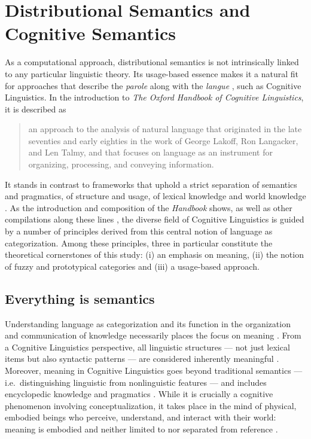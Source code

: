 \documentclass[
]{book}
\begin{document}
\hypertarget{cog}{%
\section{Distributional Semantics and Cognitive Semantics}\label{cog}}

As a computational approach, distributional semantics is not intrinsically linked to any particular linguistic theory. Its usage-based essence makes it a natural fit for approaches that describe the \emph{parole} along with the \emph{langue} \autocite[in terms of][]{desaussure_1971}, such as Cognitive Linguistics. In the introduction to \emph{The Oxford Handbook of Cognitive Linguistics}, it is described as

\begin{quote}
an approach to the analysis of natural language that originated in the late seventies and early eighties in the work of George Lakoff, Ron Langacker, and Len Talmy, and that focuses on language as an instrument for organizing, processing, and conveying information. \autocite[3]{geeraerts.cuyckens_2007a}
\end{quote}

It stands in contrast to frameworks that uphold a strict separation of semantics and pragmatics, of structure and usage, of lexical knowledge and world knowledge \autocite{geeraerts_2010a}. As the introduction and composition of the \emph{Handbook} shows, as well as other compilations along these lines \autocites[such as][]{rudzka-ostyn_1988,kristiansen.etal_2006,ibarretxe-antunano.valenzuela_2016}, the diverse field of Cognitive Linguistics is guided by a number of principles derived from this central notion of language as categorization. Among these principles, three in particular constitute the theoretical cornerstones of this study: (i) an emphasis on meaning, (ii) the notion of fuzzy and prototypical categories and (iii) a usage-based approach.

\hypertarget{everything-is-semantics}{%
\subsection{Everything is semantics}\label{everything-is-semantics}}

Understanding language as categorization and its function in the organization and communication of knowledge necessarily places the focus on meaning \autocite{geeraerts.cuyckens_2007,geeraerts_2016a}. From a Cognitive Linguistics perspective, all linguistic structures --- not just lexical items but also syntactic patterns --- are considered inherently meaningful \autocite{langacker_2008a,lemmens_2015}. Moreover, meaning in Cognitive Linguistics goes beyond traditional semantics --- i.e.~distinguishing linguistic from nonlinguistic features --- and includes encyclopedic knowledge and pragmatics \autocite{glynn_2010,geeraerts_1997}. While it is crucially a cognitive phenomenon involving conceptualization, it takes place in the mind of physical, embodied beings who perceive, understand, and interact with their world: meaning is embodied and neither limited to nor separated from reference \autocite{rohrer_2007}.
\end{document}
